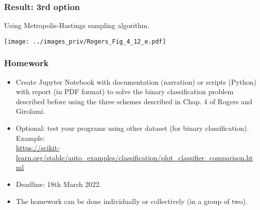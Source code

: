 \documentclass[english,10pt,aspectratio=169,fleqn]{beamer}
\begin{document}
\begin{frame} %
\frametitle{Result: 3rd option}
  
Using Metropolis-Hastings sampling algorithm.
  
{\centering
\texttt{[image: ../images\_priv/Rogers\_Fig\_4\_12\_e.pdf]}
\par}

\end{frame}


\begin{frame}
\frametitle{Homework}

\begin{itemize}
\item Create Jupyter Notebook with documentation (narration)
or scripts (Python) with report (in PDF format)
to solve the binary classification problem
described before using the three schemes described in Chap. 4 of Rogers and Girolami.
\item Optional: test your programs using other dataset (for binary classification).
Example:\\
{\footnotesize\url{https://scikit-learn.org/stable/auto_examples/classification/plot_classifier_comparison.html}}
\item Deadline: 18th March 2022.
\item The homework can be done individually or collectively (in a group of two).
\end{itemize}

\end{frame}
\end{document}

